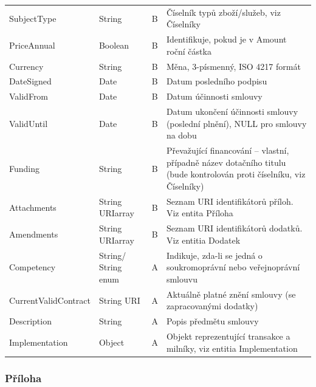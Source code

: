 \begin{center}
\begin{longtable}{lp{20mm}cp{65mm}}
\rowcolor{validateB}SubjectType & String & B & Číselník typů zboží/služeb, viz Číselníky \\
\rowcolor{validateB}PriceAnnual & Boolean & B & Identifikuje, pokud je v Amount roční částka \\
\rowcolor{validateB}Currency & String & B & Měna, 3-písmenný, ISO 4217 formát \\
\rowcolor{validateB}DateSigned & Date & B & Datum posledního podpisu \\
\rowcolor{validateB}ValidFrom & Date & B & Datum účinnosti smlouvy \\
\rowcolor{validateB}ValidUntil & Date & B & Datum ukončení účinnosti smlouvy (poslední plnění), NULL pro smlouvy na dobu \\
\rowcolor{validateB}Funding & String & B & Převažující financování – vlastní, případně název dotačního titulu (bude kontrolován proti číselníku, viz Číselníky) \\
\rowcolor{validateB}Attachments & String URIarray & B & Seznam URI identifikátorů příloh. Viz entita Příloha \\
\rowcolor{validateB}Amendments & String URIarray & B & Seznam URI identifikátorů dodatků. Viz entitia Dodatek \\
\rowcolor{validateA}Competency & String/ String enum & A & Indikuje, zda-li se jedná o soukromoprávní nebo veřejnoprávní smlouvu \\
\rowcolor{validateA}CurrentValidContract & String URI & A & Aktuálně platné znění smlouvy (se zapracovanými dodatky) \\
\rowcolor{validateA}Description & String & A & Popis předmětu smlouvy \\
\rowcolor{validateA}Implementation & Object & A & Objekt reprezentující transakce a milníky, viz entitia Implementation \\
\end{longtable}
\end{center}

\subsubsection*{Příloha}

